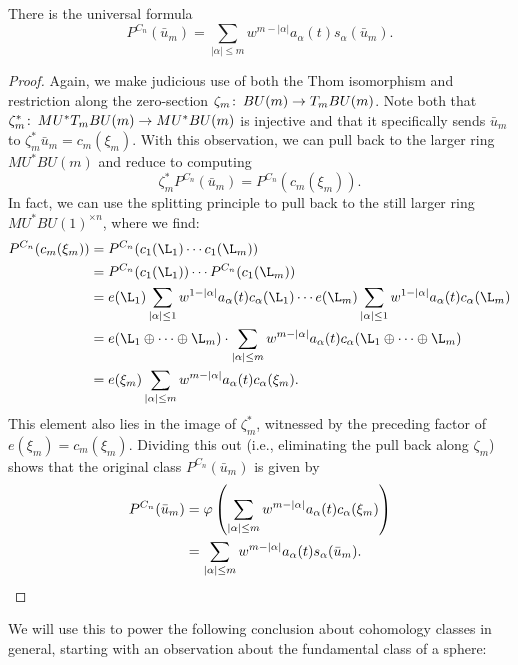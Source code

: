 \begin{corollary}\label{PCnOnUniversalMUClasses}
There is the universal formula \[P^{C_n}(\bar u_m) = \sum_{|\alpha| \le m} w^{m - |\alpha|} a_\alpha(t) s_\alpha(\bar u_m).\]
\end{corollary}
\begin{proof}
Again, we make judicious use of both the Thom isomorphism and restriction along the zero-section \(\zeta_m\co BU(m) \to T_m BU(m)\).  Note both that \(\zeta_m^*\co MU^* T_m BU(m) \to MU^* BU(m)\) is injective and that it specifically sends \(\bar u_m\) to \(\zeta_m^* \bar u_m = c_m(\xi_m)\).  With this observation, we can pull back to the larger ring \(MU^* BU(m)\) and reduce to computing \[\zeta_m^* P^{C_n}(\bar u_m) = P^{C_n}(c_m(\xi_m)).\]  In fact, we can use the splitting principle to pull back to the still larger ring \(MU^* BU(1)^{\times n}\), where we find:
\begin{align*}
P^{C_n}(c_m(\xi_m)) & = P^{C_n}(c_1(\L_1) \cdots c_1(\L_m)) \\
& = P^{C_n}(c_1(\L_1)) \cdots P^{C_n}(c_1(\L_m)) \\
& = e(\L_1)\sum_{|\alpha| \le 1} w^{1 - |\alpha|} a_\alpha(t) c_\alpha(\L_1) \cdots e(\L_m) \sum_{|\alpha| \le 1} w^{1 - |\alpha|} a_\alpha(t) c_\alpha(\L_m) \\
& = e(\L_1 \oplus \cdots \oplus \L_m) \cdot \sum_{|\alpha| \le m} w^{m - |\alpha|} a_\alpha(t) c_\alpha(\L_1 \oplus \cdots \oplus \L_m) \\
& = e(\xi_m) \sum_{|\alpha| \le m} w^{m - |\alpha|} a_\alpha(t) c_\alpha(\xi_m).
\end{align*}
This element also lies in the image of \(\zeta_m^*\), witnessed by the preceding factor of \(e(\xi_m) = c_m(\xi_m)\).  Dividing this out (i.e., eliminating the pull back along \(\zeta_m\)) shows that the original class \(P^{C_n}(\bar u_m)\) is given by
\begin{align*}
P^{C_n}(\bar u_m) & = \phi\left( \sum_{|\alpha| \le m} w^{m - |\alpha|} a_\alpha(t) c_\alpha(\xi_m) \right) \\
& = \sum_{|\alpha| \le m} w^{m - |\alpha|} a_\alpha(t) s_\alpha(\bar u_m). \qedhere
\end{align*}
\end{proof}

We will use this to power the following conclusion about cohomology classes in general, starting with an observation about the fundamental class of a sphere:

